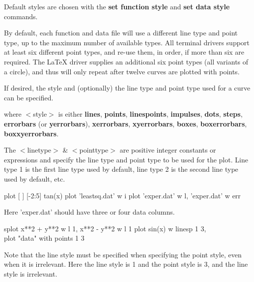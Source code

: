 Default styles are chosen with the {\bf set function style} and
{\bf set data style} commands.

By default, each function and data file will use a different
line type and point type, up to the maximum number of available
types. All terminal drivers support at least six different point
types, and re-use them, in order, if more than six are required.
The LaTeX driver supplies an additional six point types (all variants
of a circle), and thus will only repeat after twelve curves are
plotted with points.

If desired, the style and (optionally) the line type and point type
used for a curve can be specified.


where $<$style$>$ is either {\bf lines}, {\bf points}, {\bf linespoints}, {\bf impulses},
{\bf dots}, {\bf steps}, {\bf errorbars} (or {\bf yerrorbars}), 
{\bf xerrorbars}, {\bf xyerrorbars}, {\bf boxes}, {\bf boxerrorbars},
{\bf boxxyerrorbars}.

The $<$linetype$>$ \& $<$pointtype$>$ are positive
integer constants or expressions and specify the line type and point
type to be used for the plot. Line type 1 is the first line type used
by default, line type 2 is the second line type used by default, etc.

        {plot [ ] [-2:5] tan(x)}
 {plot 'leastsq.dat' w i}
{plot 'exper.dat' w l, 'exper.dat' w err}

Here 'exper.dat' should have three or four data columns.

{splot x**2 + y**2 w l 1, x**2 - y**2 w l 1}
    {plot sin(x) w linesp 1 3, \\}
{plot "data" with points 1 3}

Note that the line style must be specified when specifying the point
style, even when it is irrelevant. Here the line style is 1 and the
point style is 3, and the line style is irrelevant.


